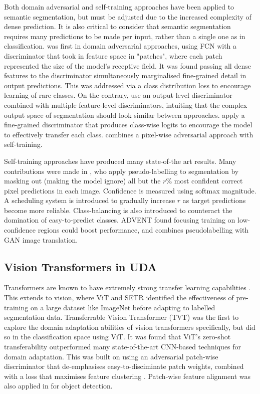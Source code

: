 \documentclass[a4paper,12pt]{report}
\begin{document}
Both domain adversarial and self-training approaches have been applied to semantic segmentation, but must be adjusted due to the increased complexity of dense prediction. It is also critical to consider that semantic segmentation requires many predictions to be made per input, rather than a single one as in classification. \cite{hoffman_fcns_2016} was first in domain adversarial approaches, using FCN with a discriminator that took in feature space in "patches", where each patch represented the size of the model's receptive field. It was found passing all dense features to the discriminator simultaneously marginalised fine-grained detail in output predictions. This was addressed via a class distribution loss to encourage learning of rare classes. On the contrary, \cite{tsai_learning_2020} use an output-level discriminator combined with multiple feature-level discriminators, intuiting that the complex output space of segmentation should look similar between approaches. \cite{wang_classes_2020} apply a fine-grained discriminator that produces class-wise logits to encourage the model to effectively transfer each class. \cite{michieli_adversarial_2020} combines a pixel-wise adversarial approach with self-training.

Self-training approaches have produced many state-of-the art results. Many contributions were made in \cite{zou_domain_2018}, who apply pseudo-labelling to segmentation by masking out (making the model ignore) all but the $r\%$ most confident correct pixel predictions in each image. Confidence is measured using softmax magnitude. A scheduling system is introduced to gradually increase $r$ as target predictions become more reliable. Class-balancing is also introduced to counteract the domination of easy-to-predict classes. ADVENT \cite{vu_advent_2019} found focusing training on low-confidence regions could boost performance, and \cite{li_bidirectional_2019} combines pseudolabelling with GAN image translation.

\subsection*{Vision Transformers in UDA}

Transformers are known to have extremely strong transfer learning capabilities \cite{radford_language_2019} \cite{wright_transformer_2020}. This extends to vision, where ViT \cite{dosovitskiy_image_2021} and SETR \cite{zheng_rethinking_2021} identified the effectiveness of pre-training on a large dataset like ImageNet before adapting to labelled segmentation data. Transferrable Vision Transformer (TVT) \cite{yang_tvt_2021} was the first to explore the domain adaptation abilities of vision transformers specifically, but did so in the classification space using ViT. It was found that ViT's zero-shot transferability outperformed many state-of-the-art CNN-based techniques for domain adaptation. This was built on using an adversarial patch-wise discriminator that de-emphasises easy-to-disciminate patch weights, combined with a loss that maximises feature clustering \cite{chapelle_semi-supervised_2005}. Patch-wise feature alignment was also applied in \cite{wang_exploring_2021} for object detection.
\end{document}
